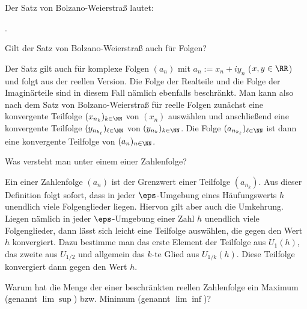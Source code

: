 \begin{antwort}
  Der Satz von Bolzano-Weierstraß lautet: 

  \medskip\noindent
  . 
  \AntEnd
\end{antwort}

\begin{frage}
  Gilt der Satz von Bolzano-Weierstraß auch für  Folgen?
\end{frage}

\begin{antwort}
  Der Satz gilt auch für komplexe Folgen $(a_n)$ mit 
  $a_n := x_n +i y_n$ ($x,y\in\RR$) und folgt aus der reellen Version. 
  Die Folge der Realteile und die Folge der Imaginärteile 
  sind in diesem Fall nämlich ebenfalls beschränkt. 
  Man kann also nach dem Satz von Bolzano-Weierstraß für reelle Folgen 
  zunächst eine 
  konvergente Teilfolge $(x_{n_k})_{k\in\NN}$ von $(x_n)$ auswählen und 
  anschließend eine konvergente Teilfolge $(y_{n_{k_\ell}})_{\ell\in\NN}$ von 
  $(y_{n_k})_{k\in\NN}$. Die Folge $(a_{n_{k_\ell}})_{\ell\in\NN}$ 
  ist dann eine konvergente Teilfolge von $(a_n)_{n\in\NN}$.
  \AntEnd
\end{antwort}

\begin{frage}%
  \label{02_hfw}
  Was versteht man unter einem  einer Zahlenfolge? 
\end{frage}

\begin{antwort}
  Ein  einer Zahlenfolge $(a_n)$ ist der Grenzwert einer 
  Teilfolge $(a_{n_k})$. Aus dieser Definition folgt sofort, dass 
  in jeder $\eps$-Umgebung eines Häufungswerts $h$ unendlich viele 
  Folgenglieder liegen. Hiervon gilt aber auch die Umkehrung. 
  Liegen nämlich in jeder $\eps$-Umgebung einer Zahl $h$ unendlich viele 
  Folgenglieder, dann lässt sich leicht eine Teilfolge auswählen, die 
  gegen den Wert $h$ konvergiert. Dazu bestimme man das erste Element der 
  Teilfolge aus $U_1(h)$, das zweite aus $U_{1/2}$ und allgemein 
  das $k$-te Glied aus $U_{1/k}(h)$. Diese Teilfolge konvergiert 
  dann gegen den Wert $h$.
  \AntEnd
\end{antwort}

\begin{frage}%
  \label{02_lsup}
  Warum hat die Menge der  einer 
  beschränkten reellen Zahlenfolge ein Maximum 
  (genannt $\lim\sup$) bzw. Minimum (genannt $\lim\inf$)? 
\end{frage}

